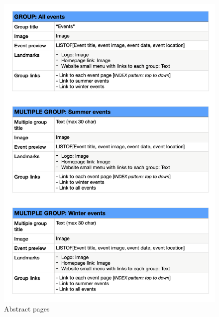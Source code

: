 \documentclass[table, 12pt]{article}
\begin{document}
\begin{figure}[H]
    \begin{center}
        \includegraphics[width=\textwidth]{assets/Tables/Abstract/abstractPage3.png}
        \caption{Abstract pages}
    \end{center}
\end{figure}
\end{document}
